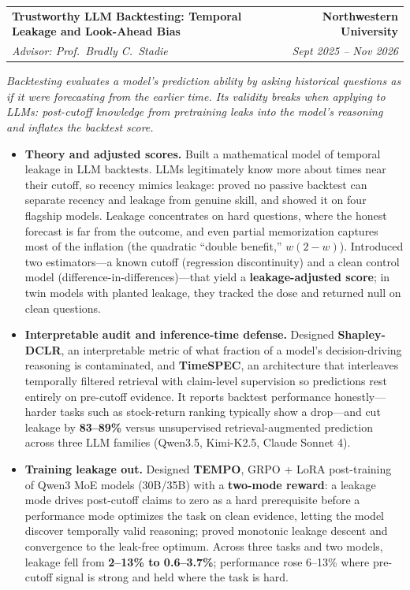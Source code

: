 \documentclass[10.5pt]{article}
\makeatletter
\newcommand{\story}[1]{%
  \par\vspace{3pt}
  \noindent{\color{accent}\vrule width 2pt}\hspace{8pt}%
  \begin{minipage}[t]{\dimexpr\textwidth-13pt\relax}
    {\small\itshape #1}
  \end{minipage}\par\vspace{3pt}}
\newcommand{\facet}[1]{\textcolor{accent}{\textbf{#1}}}
\newcommand{\entry}[4]{%
  \begin{tabularx}{\textwidth}{@{}X@{}r@{}}
    \textbf{#1} & \textbf{#2} \\
    {\itshape\color{metagray}#3} & {\itshape\color{metagray}#4} \\
  \end{tabularx}\vspace{2pt}}
\newenvironment{bullets}
  {\begin{itemize}[leftmargin=1.35em, topsep=2.5pt, itemsep=2pt, parsep=0pt,
                   label=\textcolor{accent}{\footnotesize$\bullet$}]\small}
  {\end{itemize}}
\makeatother
\begin{document}
\entry{Trustworthy LLM Backtesting: Temporal Leakage and Look-Ahead Bias}
  {Northwestern University}
  {Advisor: Prof.\ Bradly C.\ Stadie}{Sept 2025 -- Nov 2026}
\story{Backtesting evaluates a model's prediction ability by asking historical questions as if it were forecasting from
  the earlier time. Its validity breaks when applying to LLMs: post-cutoff knowledge from pretraining leaks into the
  model's reasoning and inflates the backtest score.}
\begin{bullets}
  \item \facet{Theory and adjusted scores.} Built a mathematical model of temporal leakage in LLM backtests.
        LLMs legitimately know more about times near their cutoff, so recency mimics leakage: proved no
        passive backtest can separate recency and leakage from genuine skill, and showed it on four flagship
        models. Leakage concentrates on hard questions, where the honest forecast is far from the outcome,
        and even partial memorization captures most of the inflation (the quadratic ``double benefit,''
        $w(2-w)$). Introduced two estimators---a known cutoff (regression discontinuity) and a clean control
        model (difference-in-differences)---that yield a \textbf{leakage-adjusted score}; in twin models with
        planted leakage, they tracked the dose and returned null on clean questions.
  \item \facet{Interpretable audit and inference-time defense.} Designed \textbf{Shapley-DCLR}, an
        interpretable metric of what fraction of a model's decision-driving reasoning is contaminated, and
        \textbf{TimeSPEC}, an architecture that interleaves temporally filtered retrieval with claim-level
        supervision so predictions rest entirely on pre-cutoff evidence. It reports backtest performance
        honestly---harder tasks such as stock-return ranking typically show a drop---and cut leakage by
        \textbf{83--89\%} versus unsupervised retrieval-augmented prediction across three LLM families (Qwen3.5, Kimi-K2.5, Claude Sonnet 4).
  \item \facet{Training leakage out.} Designed \textbf{TEMPO}, GRPO + LoRA post-training of Qwen3 MoE models (30B/35B) with a \textbf{two-mode
        reward}: a leakage mode drives post-cutoff claims to zero as a hard prerequisite before a performance
        mode optimizes the task on clean evidence, letting the model discover temporally valid reasoning;
        proved monotonic leakage descent and convergence to the leak-free optimum. Across three tasks and two
        models, leakage fell from \textbf{2--13\% to 0.6--3.7\%}; performance rose 6--13\% where pre-cutoff
        signal is strong and held where the task is hard.
\end{bullets}
\end{document}

